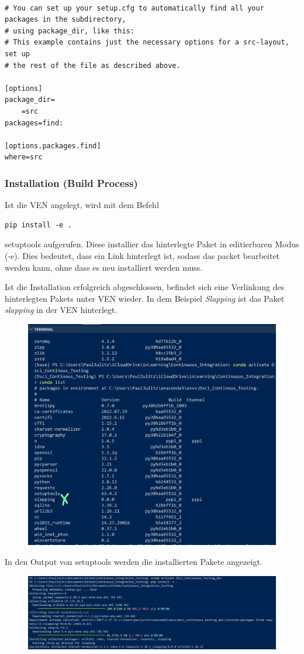 \begin{lstlisting}[style=Config, caption={Setuptools find all packges}, captionpos=b]

# You can set up your setup.cfg to automatically find all your packages in the subdirectory, 
# using package_dir, like this:
# This example contains just the necessary options for a src-layout, set up
# the rest of the file as described above.

[options]
package_dir=
    =src
packages=find:

[options.packages.find]
where=src
\end{lstlisting}



\subsubsection{Installation (Build Process)}
Ist die \gls{VEN} angelegt, wird mit dem Befehl

\begin{lstlisting}[style=CMD]
	pip install -e .
\end{lstlisting}

setuptools aufgerufen. Diese installier das hinterlegte Paket in editierbaren Modus (-e). 
Dies bedeutet, dass ein Link hinterlegt ist, sodass das packet bearbeitet werden kann, ohne dass es neu installiert werden muss.

Ist die Installation erfolgreich abgeschlossen, befindet sich eine Verlinkung des hinterlegten Pakets unter \gls{VEN} wieder. In dem Beispiel \textit{Slapping} ist das Paket \textit{slapping} in der \gls{VEN} hinterlegt.
\begin{figure}[H]
	\centering
	\includegraphics[scale = 0.4]{attachment/chapter_2/Scc074}
\end{figure}

In den Output von setuptools werden die installierten Pakete angezeigt. 
\begin{figure}[H]
	\centering
	\includegraphics[scale = 0.4]{attachment/chapter_2/Scc076}
\end{figure}
